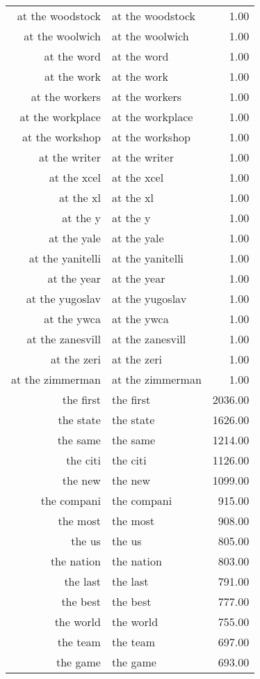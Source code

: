 \begin{table}[ht]
\begin{tabular}{rlr}
  at the woodstock & at the woodstock & 1.00 \\ 
  at the woolwich & at the woolwich & 1.00 \\ 
  at the word & at the word & 1.00 \\ 
  at the work & at the work & 1.00 \\ 
  at the workers & at the workers & 1.00 \\ 
  at the workplace & at the workplace & 1.00 \\ 
  at the workshop & at the workshop & 1.00 \\ 
  at the writer & at the writer & 1.00 \\ 
  at the xcel & at the xcel & 1.00 \\ 
  at the xl & at the xl & 1.00 \\ 
  at the y & at the y & 1.00 \\ 
  at the yale & at the yale & 1.00 \\ 
  at the yanitelli & at the yanitelli & 1.00 \\ 
  at the year & at the year & 1.00 \\ 
  at the yugoslav & at the yugoslav & 1.00 \\ 
  at the ywca & at the ywca & 1.00 \\ 
  at the zanesvill & at the zanesvill & 1.00 \\ 
  at the zeri & at the zeri & 1.00 \\ 
  at the zimmerman & at the zimmerman & 1.00 \\ 
  the first & the first & 2036.00 \\ 
  the state & the state & 1626.00 \\ 
  the same & the same & 1214.00 \\ 
  the citi & the citi & 1126.00 \\ 
  the new & the new & 1099.00 \\ 
  the compani & the compani & 915.00 \\ 
  the most & the most & 908.00 \\ 
  the us & the us & 805.00 \\ 
  the nation & the nation & 803.00 \\ 
  the last & the last & 791.00 \\ 
  the best & the best & 777.00 \\ 
  the world & the world & 755.00 \\ 
  the team & the team & 697.00 \\ 
  the game & the game & 693.00 \\ 

\end{tabular}
\end{table}
